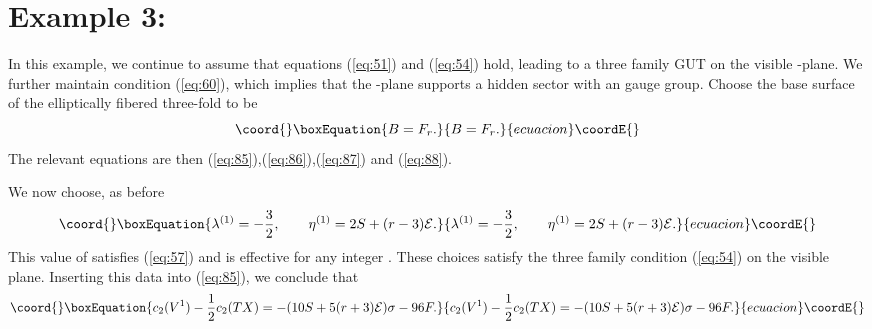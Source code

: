 \documentclass[a4paper,12pt]{article}
\numberwithin{equation}{section}
\theoremstyle{plain}
\begin{document}
\section*{Example 3: \coordHE{}}

In this example, we continue to assume that equations (\ref{eq:51}) and
(\ref{eq:54}) hold, leading to a three family \coordHE{} GUT on the visible
\coordHE{}-plane. We further maintain condition (\ref{eq:60}), which implies that the
\coordHE{}-plane supports a hidden sector with an \coordHE{} gauge group. Choose the
base surface of the elliptically fibered three-fold to be
%
\begin{equation}\coord{}\boxEquation{
B=F_{r}.
\label{eq:101}
}{
B=F_{r}.
}{ecuacion}\coordE{}\end{equation}
%
The relevant equations are then (\ref{eq:85}),(\ref{eq:86}),(\ref{eq:87}) and
(\ref{eq:88}).

We now choose, as before
%
\begin{equation}\coord{}\boxEquation{
\lambda^{(1)}=-\frac{3}{2}, \qquad \eta^{(1)}=2S+(r-3){\cal{E}}.
\label{eq:102}
}{
\lambda^{(1)}=-\frac{3}{2}, \qquad \eta^{(1)}=2S+(r-3){\cal{E}}.
}{ecuacion}\coordE{}\end{equation}
%
This value of \coordHE{} satisfies (\ref{eq:57}) and \coordHE{} is
effective for any integer \coordHE{}. These choices satisfy the three family
condition (\ref{eq:54}) on the visible plane. Inserting this data into
(\ref{eq:85}), we conclude that
%
\begin{equation}\coord{}\boxEquation{
c_{2}(V^{1})-\frac{1}{2}c_{2}(TX)=-(10S+5(r+3){\cal{E}})\sigma-96F.
\label{eq:103}
}{
c_{2}(V^{1})-\frac{1}{2}c_{2}(TX)=-(10S+5(r+3){\cal{E}})\sigma-96F.
}{ecuacion}\coordE{}\end{equation}
%
\end{document}
